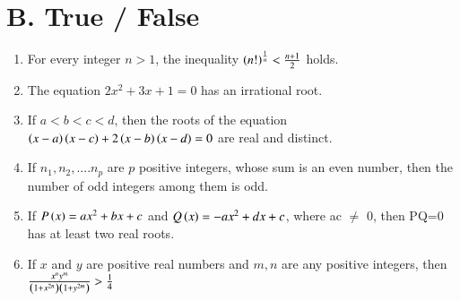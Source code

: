 \documentclass[journal,12pt,twocolumn]{IEEEtran}
\theoremstyle{remark}
\begin{document}
\section*{B. True / False}
\begin{enumerate}
    \item For every integer $n>1$, the inequality $\left(n!\right)^\frac{1}{n} < \frac{n+1}{2}$ holds. \hfill {}
    \item The equation $2x^2 + 3x + 1 = 0$ has an irrational root. \hfill {}
    \item If $a<b<c<d$, then the roots of the equation $\left(x-a\right)\left(x-c\right)+2\left(x-b\right)\left(x-d\right)=0$ are real and distinct. \hfill {}
    \item If $n_1, n_2, ....n_p$ are $p$ positive integers, whose sum is an even number, then the number of odd integers among them is odd.\hfill {}
    \item If $P\left(x\right) = ax^2+bx+c$ and $Q\left(x\right)= -ax^2+dx+c$, where ac $\neq$ 0, then PQ=0 has at least two real roots. \hfill {}
    \item If $x$ and $y$ are positive real numbers and $m,n$ are any positive integers, then $\frac{x^ny^m}{\left(1+ x^{2n}\right)\left(1+ y^{2m}\right)} > \frac{1}{4}$ \hfill {}



\end{enumerate}
\renewcommand{\thefigure}{\theenumi}
\renewcommand{\thetable}{\theenumi}
\end{document}
